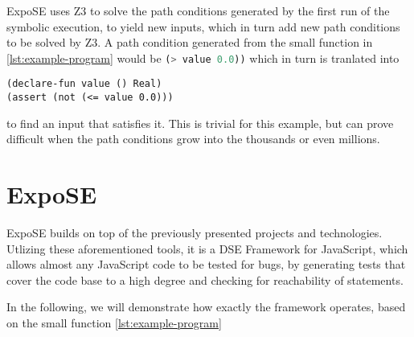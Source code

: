 ExpoSE uses Z3 to solve the path conditions generated by the first run of the symbolic execution, to yield new inputs, which in turn add new path conditions to be solved by Z3. 
A path condition generated from the small function in \autoref{lst:example-program} would be \lstinline[language=JavaScript]+(> value 0.0))+ which in turn is tranlated into
\begin{lstlisting}
(declare-fun value () Real)
(assert (not (<= value 0.0)))
\end{lstlisting}
to find an input that satisfies it. This is trivial for this example, but can prove difficult when the path conditions grow into the thousands or even millions.


\section{ExpoSE}
\label{sec:expose}
ExpoSE builds on top of the previously presented projects and technologies. Utlizing these aforementioned tools, it is a DSE Framework for JavaScript, which allows almost any JavaScript code to be tested for bugs, by generating tests that cover the code base to a high degree and checking for reachability of statements. \cite{loring_expose_2017}

In the following, we will demonstrate how exactly the framework operates, based on the small function \autoref{lst:example-program}
 
